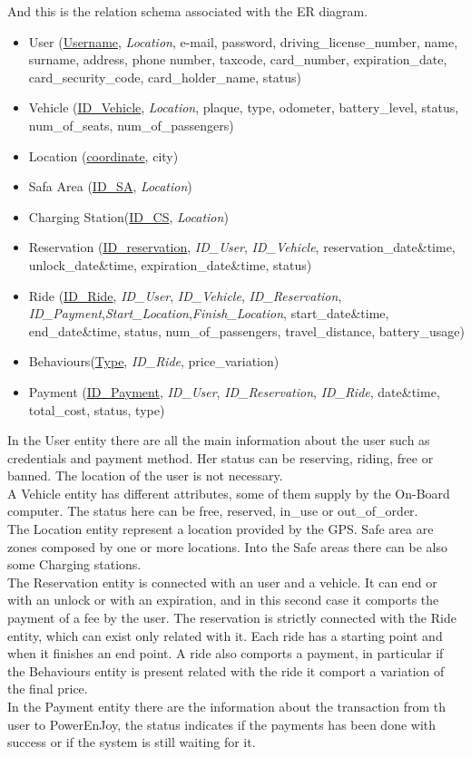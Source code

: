  And this is the relation schema associated with the ER diagram.
\begin{itemize} 
	\item{User (\underline{Username}, \textit{Location}, e-mail, password, driving\_license\_number, name, surname, address, phone number, taxcode, card\_number, expiration\_date, card\_security\_code, card\_holder\_name, status)} %
	\item{Vehicle (\underline{ID\_Vehicle}, \textit{Location}, plaque, type, odometer, battery\_level, status, num\_of\_seats, num\_of\_passengers) }
	\item{Location (\underline{coordinate}, city)}	
	\item{Safa Area (\underline{ID\_SA}, \textit{Location})} %
	\item{Charging Station(\underline{ID\_CS}, \textit{Location})}
	\item{Reservation (\underline{ID\_reservation}, \textit{ID\_User}, \textit{ID\_Vehicle}, reservation\_date\&time, unlock\_date\&time, expiration\_date\&time, status)}
	\item{Ride (\underline{ID\_Ride}, \textit{ID\_User}, \textit{ID\_Vehicle}, \textit{ID\_Reservation}, \textit{ID\_Payment},\textit{Start\_Location},\textit{Finish\_Location}, start\_date\&time, end\_date\&time, status, num\_of\_passengers, travel\_distance, battery\_usage)}
	\item{Behaviours(\underline{Type}, \textit{ID\_Ride}, price\_variation)}
	\item{Payment (\underline{ID\_Payment}, \textit{ID\_User}, \textit{ID\_Reservation}, \textit{ID\_Ride}, date\&time, total\_cost, status, type)}
\end{itemize}
In the User entity there are all the main information about the user such as credentials and payment method. Her status can be reserving, riding, free or banned. The location of the user is not necessary.
\\A Vehicle entity has different attributes, some of them supply by the On-Board computer. The status here can be free, reserved, in_use or out_of_order.
\\The Location entity represent a location provided by the GPS. Safe area are zones composed by one or more locations. Into the Safe areas there can be also some Charging stations.
\\The Reservation entity is connected with an user and a vehicle. It can end or with an unlock or with an expiration, and in this second case it comports the payment of a fee by the user. The reservation is strictly connected with the Ride entity, which can exist only related with it. Each ride has a starting point and when it finishes an end point. A ride also comports a payment, in particular if the Behaviours entity is present related with the ride it comport a variation of the final price. 
\\In the Payment entity there are the information about the transaction from th user to PowerEnJoy, the status indicates if the payments has been done with success or if the system is still waiting for it.

